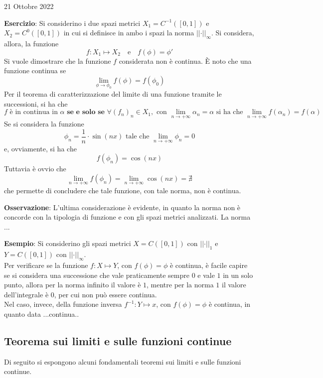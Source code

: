\documentclass[a4paper]{extarticle}
\begin{document}
\newpage
\noindent
\begin{center}
    21 Ottobre 2022
\end{center}
\textbf{Esercizio}: Si considerino i due spazi metrici $X_1 = C^{-1}([0,1])$ e $X_2 = C^0([0,1])$ in cui si definisce in ambo i spazi la norma $\vert \vert \cdot \vert \vert_{\infty}$. Si considera, allora, la funzione
\[f : X_1 \longmapsto X_2 \hspace{1em} \text{e} \hspace{1em} f(\phi) = \phi'\]
Si vuole dimostrare che la funzione $f$ considerata non è continua. È noto che una funzione continua se
\[\lim_{\phi \to \phi_0} f(\phi) = f(\phi_0)\]
Per il teorema di caratterizzazione del limite di una funzione tramite le successioni, si ha che
\[f \text{ è in continua in } \alpha \textbf{ se e solo se } \forall (f_n)_n \in X_1, \text{ con } \lim_{n \to +\infty} \alpha_n = \alpha \text{ si ha che } \lim_{n \to +\infty} f(\alpha_n) = f(\alpha)\]
Se si considera la funzione
\[\phi_n=\frac{1}{n} \cdot \sin(n x) \text{ tale che } \lim_{n \to + \infty} \phi_n = 0\]
e, ovviamente, si ha che
\[f(\phi_n)=\cos(n x)\]
Tuttavia è ovvio che
\[\lim_{n \to +\infty} f(\phi_n) = \lim_{n \to +\infty} \cos(nx) = \nexists\]
che permette di concludere che tale funzione, con tale norma, non è continua.

\vspace{1em}
\noindent
\textbf{Osservazione}: L'ultima considerazione è evidente, in quanto la norma non è concorde con la tipologia di funzione e con gli spazi metrici analizzati. La norma ...

\vspace{1em}
\noindent
\textbf{Esempio}: Si considerino gli spazi metrici $X=C([0,1])$ con $\vert \vert \cdot \vert \vert_1$ e $Y=C([0,1])$ con $\vert \vert \cdot \vert \vert_{\infty}$.\\
Per verificare se la funzione $f : X \longmapsto Y$, con $f(\phi)=\phi$ è continua, è facile capire se si considera una successione che vale praticamente sempre $0$ e vale $1$ in un solo punto, allora per la norma infinito il valore è $1$, mentre per la norma $1$ il valore dell'integrale è $0$, per cui non può essere continua.\\
Nel caso, invece, della funzione inversa $f^{-1} : Y \longmapsto x$, con $f(\phi)=\phi$ è continua, in quanto data ...continua..

\vspace{1em}
\noindent
\subsection{Teorema sui limiti e sulle funzioni continue}
Di seguito si espongono alcuni fondamentali teoremi sui limiti e sulle funzioni continue.
\end{document}
